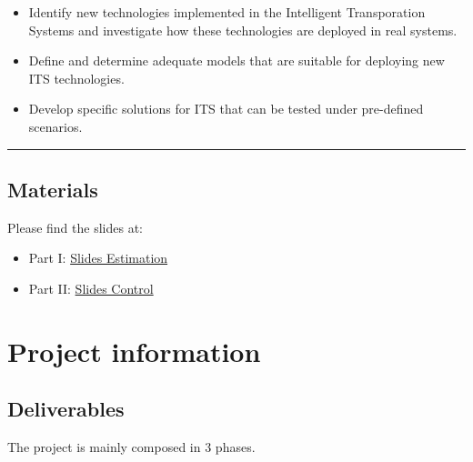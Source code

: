\documentclass[]{book}
\providecommand{\tightlist}{%
  \setlength{\itemsep}{0pt}\setlength{\parskip}{0pt}}
\theoremstyle{definition}
\theoremstyle{definition}
\theoremstyle{definition}
\theoremstyle{remark}
\begin{document}
\begin{itemize}
\tightlist
\item
  Identify new technologies implemented in the Intelligent Transporation
  Systems and investigate how these technologies are deployed in real
  systems.
\item
  Define and determine adequate models that are suitable for deploying
  new ITS technologies.
\item
  Develop specific solutions for ITS that can be tested under
  pre-defined scenarios.
\end{itemize}

\begin{center}\rule{0.5\linewidth}{\linethickness}\end{center}

\hypertarget{materials}{%
\section*{Materials}\label{materials}}

Please find the slides at:

\begin{itemize}
\tightlist
\item
  Part I: \href{http://bit.ly/ITSIIS05E01}{Slides Estimation}
\item
  Part II: \href{http://bit.ly/ITSIIS05E02}{Slides Control}
\end{itemize}

\hypertarget{project-information}{%
\chapter*{Project information}\label{project-information}}

\hypertarget{deliverables}{%
\section*{Deliverables}\label{deliverables}}

The project is mainly composed in 3 phases.
\end{document}
